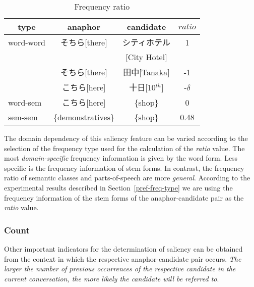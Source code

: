 \setlength{\tabcolsep}{5pt}
\begin{table}[hbt]
  \vspace*{-0.75\baselineskip}
   \begin{center}
   \begin{footnotesize}
    \caption{Frequency ratio}\label{tab-ratio} 
    \begin{tabular}{|lccc|}
      \hline
      \multicolumn{1}{|c}{type} & anaphor & candidate & $ratio$ \\
      \hline \hline
      word-word & そちら[there]  & シティホテル      &    1   \\[-0.5em]
                &                & [City Hotel]      &        \\
                & そちら[there]  & 田中[Tanaka]      &   -1   \\
                & こちら[here]   & 十日[10${}^{th}$]   & -$\delta$ \\
      \hline
      word-sem  & こちら[here]   & \{shop\}          &    0   \\
      \hline
      sem-sem   & \{demonstratives\} & \{shop\}      & 0.48   \\
      \hline
    \end{tabular}
   \end{footnotesize}
   \end{center}
   \vspace*{-1.5\baselineskip}
\end{table}

The domain dependency of this saliency feature can be varied according to the selection
of the frequency type used for the calculation of the {\em ratio} value.
The most {\em domain-specific} frequency information is given by the word form. Less
specific is the frequency information of stem forms.
In contrast, the frequency ratio of semantic classes and parts-of-speech are more
{\em general}. According to the experimental results described in Section~\ref{pref-freq-type}
we are using the frequency information of the stem forms of the anaphor-candidate pair as the {\em ratio} value.

\subsubsection{Count}
\label{pref-count}

Other important indicators for the determination of saliency can be obtained from
the context in which the respective anaphor-candidate pair occurs.
{\em The larger the number of previous occurrences of the respective candidate
in the current conversation, the more likely the candidate will be referred to}.

